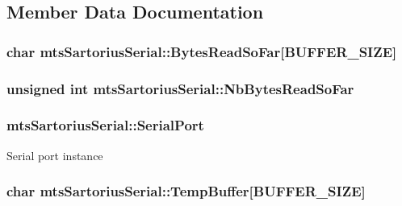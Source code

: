 \subsection{Member Data Documentation}
\hypertarget{classmts_sartorius_serial_ae348c055cadd8ffe27284c8e2a9924d5}{
\subsubsection[{Bytes\-Read\-So\-Far}]{\setlength{\rightskip}{0pt plus 5cm}char mts\-Sartorius\-Serial\-::\-Bytes\-Read\-So\-Far\mbox{[}{\bf B\-U\-F\-F\-E\-R\-\_\-\-S\-I\-Z\-E}\mbox{]}\hspace{0.3cm}{\ttfamily [protected]}}}\label{classmts_sartorius_serial_ae348c055cadd8ffe27284c8e2a9924d5}
\hypertarget{classmts_sartorius_serial_a124551b1b4929356d1b40d78666316ed}{
\subsubsection[{Nb\-Bytes\-Read\-So\-Far}]{\setlength{\rightskip}{0pt plus 5cm}unsigned int mts\-Sartorius\-Serial\-::\-Nb\-Bytes\-Read\-So\-Far\hspace{0.3cm}{\ttfamily [protected]}}}\label{classmts_sartorius_serial_a124551b1b4929356d1b40d78666316ed}
\hypertarget{classmts_sartorius_serial_af266db2d34490ee1fe17c10b8aba6be8}{
\subsubsection[{Serial\-Port}]{ mts\-Sartorius\-Serial\-::\-Serial\-Port\hspace{0.3cm}{\ttfamily [protected]}}}\label{classmts_sartorius_serial_af266db2d34490ee1fe17c10b8aba6be8}
Serial port instance \hypertarget{classmts_sartorius_serial_a0b786c0a9cf4fbefff9d6727c9f6fd56}{
\subsubsection[{Temp\-Buffer}]{\setlength{\rightskip}{0pt plus 5cm}char mts\-Sartorius\-Serial\-::\-Temp\-Buffer\mbox{[}{\bf B\-U\-F\-F\-E\-R\-\_\-\-S\-I\-Z\-E}\mbox{]}\hspace{0.3cm}{\ttfamily [protected]}}}\label{classmts_sartorius_serial_a0b786c0a9cf4fbefff9d6727c9f6fd56}

